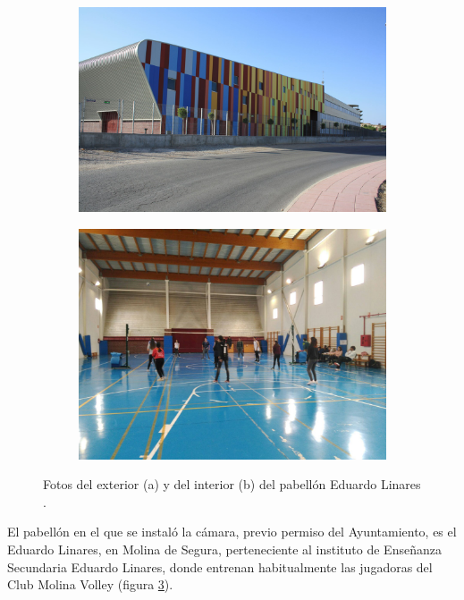 \begin{figure}
\begin{subfigure}{.5\textwidth}
  \centering
  \includegraphics[width=.9\linewidth]{images/EduardoLinares}
  \caption { }
  \label{fig:pabellonFuera}
\end{subfigure}%
\begin{subfigure}{.5\textwidth}
  \centering
  \includegraphics[width=.9\linewidth]{images/EduardoLinaresDentro}
  \caption { }
  \label{fig:pabellonDentro}
\end{subfigure}
\caption{Fotos del exterior (a) y del interior (b) del pabellón Eduardo Linares \cite{tfg}. }
\label{fig:pabellon}
\end{figure}

El pabellón en el que se instaló la cámara, previo permiso del Ayuntamiento, es el Eduardo Linares, en Molina de Segura, perteneciente al instituto de Enseñanza Secundaria Eduardo Linares, donde entrenan habitualmente las jugadoras del Club Molina Volley (figura \ref{fig:pabellon}).


